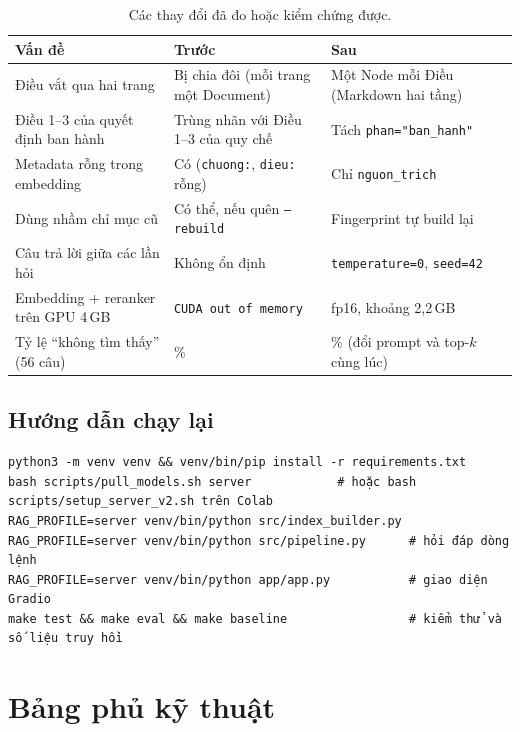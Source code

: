 \begin{table}[H]
  \centering
  \small
  \begin{tabularx}{\textwidth}{>{\hsize=0.8\hsize}X >{\hsize=1.1\hsize}X >{\hsize=1.1\hsize}X}
    \toprule
    \textbf{Vấn đề} & \textbf{Trước} & \textbf{Sau} \\
    \midrule
    Điều vắt qua hai trang & Bị chia đôi (mỗi trang một Document) & Một Node mỗi Điều (Markdown hai tầng) \\
    Điều 1--3 của quyết định ban hành & Trùng nhãn với Điều 1--3 của quy chế & Tách \texttt{phan="ban\_hanh"} \\
    Metadata rỗng trong embedding & Có (\texttt{chuong:}, \texttt{dieu:} rỗng) & Chỉ \texttt{nguon\_trich} \\
    Dùng nhầm chỉ mục cũ & Có thể, nếu quên \texttt{--rebuild} & Fingerprint tự build lại \\
    Câu trả lời giữa các lần hỏi & Không ổn định & \texttt{temperature=0}, \texttt{seed=42} \\
    Embedding + reranker trên GPU 4\,GB & \texttt{CUDA out of memory} & fp16, khoảng 2,2\,GB \\
    Tỷ lệ ``không tìm thấy'' (56 câu) & 52\% & 41\% (đổi prompt và top-$k$ cùng lúc) \\
    \bottomrule
  \end{tabularx}
  \caption{Các thay đổi đã đo hoặc kiểm chứng được.}
\end{table}

\subsection{Hướng dẫn chạy lại}

\begin{lstlisting}[caption={Các lệnh chạy lại (từ thư mục gốc repo).}, label={lst:chay-lai}]
python3 -m venv venv && venv/bin/pip install -r requirements.txt
bash scripts/pull_models.sh server            # hoặc bash scripts/setup_server_v2.sh trên Colab
RAG_PROFILE=server venv/bin/python src/index_builder.py
RAG_PROFILE=server venv/bin/python src/pipeline.py      # hỏi đáp dòng lệnh
RAG_PROFILE=server venv/bin/python app/app.py           # giao diện Gradio
make test && make eval && make baseline                 # kiểm thử và số liệu truy hồi
\end{lstlisting}

\section{Bảng phủ kỹ thuật}
\label{sec:bang-phu}

